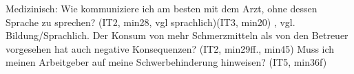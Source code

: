 
Medizinisch:
    Wie kommuniziere ich am besten mit dem Arzt, ohne dessen Sprache zu sprechen? (IT2, min28, vgl sprachlich)(IT3, min20) , vgl. Bildung/Sprachlich.
    Der Konsum von mehr Schmerzmitteln als von den Betreuer vorgesehen hat auch 
    negative Konsequenzen? (IT2, min29ff., min45)
    Muss ich meinen Arbeitgeber auf meine Schwerbehinderung hinweisen? (IT5, min36f)